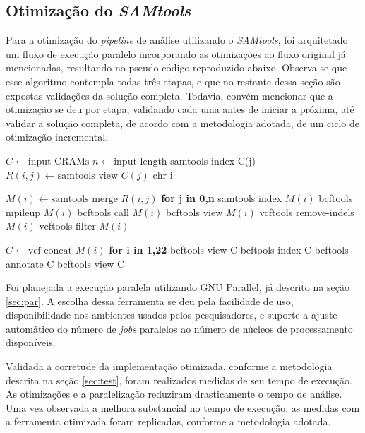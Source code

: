 \documentclass[cic,tc]{iiufrgs}
\begin{document}
\subsection{Otimização do \textit{SAMtools}}
\label{sec:parsamtools}

Para a otimização do \textit{pipeline} de análise utilizando o
\textit{SAMtools}, foi arquitetado um fluxo de execução paralelo incorporando
as otimizações ao fluxo original já mencionadas, resultando no pseudo código
reproduzido abaixo. Observa-se que esse algoritmo contempla todas três etapas,
e que no restante dessa seção são expostas validações da solução completa.
Todavia, convém mencionar que a otimização se deu por etapa, validando cada uma
antes de iniciar a próxima, até validar a solução completa, de acordo com a
metodologia adotada, de um ciclo de otimização incremental.

\begin{algorithmic}
  \State $C \gets \text{input CRAMs}$
  \State $n \gets \text{input length}$
  \State samtools index C(j)
    \State $R(i,j) \gets \text{samtools view } C(j) \text{ chr i}$
  \EndFor
\EndFor

  \State $M(i) \gets \text{samtools merge } R(i,j)$ \textbf{for j in 0,n}
  \State samtools index $M(i)$
  \State bcftools mpileup $M(i)$
  \State bcftools call $M(i)$
  \State bcftools view $M(i)$
  \State vcftools remove-indels $M(i)$
  \State vcftools filter $M(i)$
\EndFor

\State $C \gets \text{vcf-concat } M(i)$ \textbf{for i in 1,22}
\State bcftools view C
\State bcftools index C
\State bcftools annotate C
\State bcftools view C
\end{algorithmic}

Foi planejada a execução paralela utilizando GNU Parallel, já descrito na seção
\ref{sec:par}. A escolha dessa ferramenta se deu pela facilidade de uso,
disponibilidade nos ambientes usados pelos pesquisadores, e suporte a ajuste
automático do número de \textit{jobs} paralelos ao número de núcleos de
processamento disponíveis. 

Validada a corretude da implementação otimizada, conforme a metodologia
descrita na seção \ref{sec:test}, foram realizados medidas de seu tempo de
execução. As otimizações e a paralelização reduziram drasticamente o tempo de
análise. Uma vez observada a melhora substancial no tempo de execução, as
medidas com a ferramenta otimizada foram replicadas, conforme a metodologia
adotada. 
\end{document}
